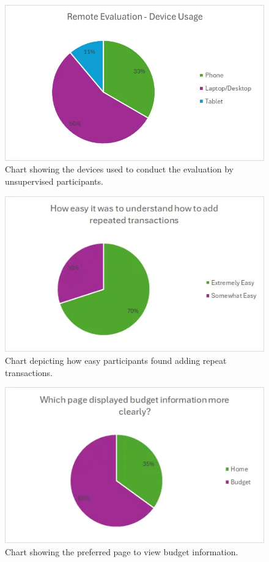 \documentclass{l4proj}
\begin{document}
\begin{appendices}
\begin{figure}[H]
    \centering
    \includegraphics[width=0.75\linewidth]{images/Evaluation-Charts/remote-devices.png}
    \caption{Chart showing the devices used to conduct the evaluation by unsupervised participants.}
    \label{fig:enter-label}
\end{figure}

\begin{figure}[H]
    \centering
    \includegraphics[width=0.75\linewidth]{images/Evaluation-Charts/ease-repeated-trans.png}
    \caption{Chart depicting how easy participants found adding repeat transactions.}
    \label{fig:enter-label}
\end{figure}

\begin{figure}[H]
    \centering
    \includegraphics[width=0.75\linewidth]{images/Evaluation-Charts/clear-budget.png}
    \caption{Chart showing the preferred page to view budget information.}
    \label{fig:enter-label}
\end{figure}


\end{appendices}
\end{document}
